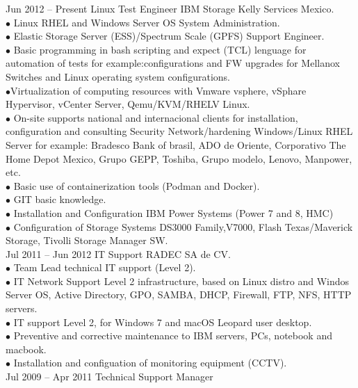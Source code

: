 \documentclass[9pt]{developercv} %
\begin{document}

\begin{entrylist}
	\entry
		{Jun 2012 -- Present}
		{Linux Test Engineer IBM Storage}
		{Kelly Services Mexico.}
			{{}\\$\bullet$ Linux RHEL and Windows Server OS System Administration.
				\\$\bullet$ Elastic Storage Server (ESS)/Spectrum Scale (GPFS) Support Engineer.
					\\$\bullet$ Basic programming in bash scripting and expect (TCL) lenguage for automation of tests for example:configurations and FW upgrades for Mellanox Switches and Linux operating system configurations.						
				\\$\bullet$Virtualization of computing resources with Vmware vsphere, vSphare Hypervisor, vCenter Server, Qemu/KVM/RHELV Linux.
				\\$\bullet$ On-site supports national and internacional clients for installation, configuration and consulting Security Network/hardening Windows/Linux RHEL Server for example:
				Bradesco Bank of brasil, ADO de Oriente, Corporativo The Home Depot Mexico, Grupo GEPP, Toshiba, Grupo modelo, Lenovo, Manpower,
				etc.
				\\$\bullet$ Basic use of containerization tools (Podman and Docker).			
				\\$\bullet$ GIT basic knowledge.
				\\$\bullet$ Installation and Configuration IBM Power Systems (Power 7 and 8, HMC)\\$\bullet$ Configuration of Storage Systems DS3000 Family,V7000, Flash Texas/Maverick Storage, Tivolli Storage Manager SW.\\}
	\entry
	{Jul 2011 -- Jun 2012}
	{IT Support}
	{RADEC SA de CV.}
	{{} \\$\bullet$ Team Lead technical IT support (Level 2). 
		\\$\bullet$ IT Network Support Level 2 infrastructure, based
		on Linux distro and Windos Server OS, Active Directory, GPO, SAMBA, DHCP, Firewall, FTP,
		NFS, HTTP servers.
		\\$\bullet$ IT support Level 2, for Windows 7 and macOS Leopard user desktop.
		\\$\bullet$ Preventive and corrective maintenance to IBM servers, PCs, notebook and macbook.\\$\bullet$ Installation and configuation of monitoring equipment (CCTV).\\}
	\entry
	{Jul 2009 -- Apr 2011}
		{Technical Support Manager}

\end{entrylist}
\end{document}
